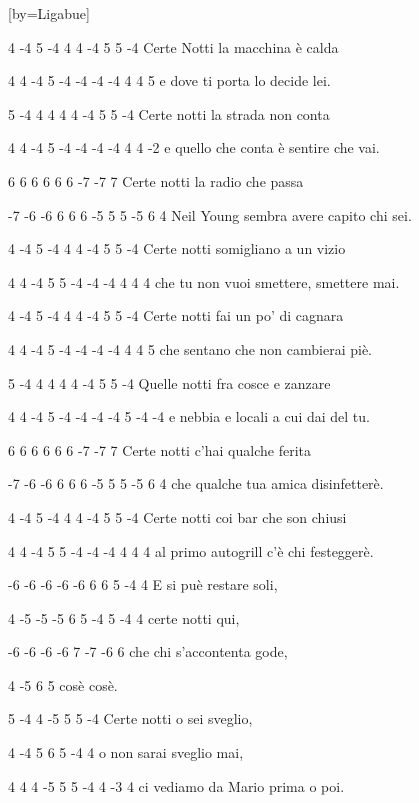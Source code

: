 
[by={Ligabue}]

\beginverse

4 -4  5 -4  4  4  -4  5  5  -4
Certe Notti la macchina è calda 

4 4 -4 5  -4 -4 -4 -4 4 4  5
e dove ti porta lo decide lei.

5 -4  4  4  4  4  -4  5  5  -4
Certe notti la strada non conta 

4  4 -4   5  -4 -4 -4 -4  4   4  -2
e quello che conta è sentire che vai.

6   6 6   6  6 6 -7   -7  7
Certe notti la radio che passa 

-7 -6 -6  6  6  6 -5  5  5 -5   6  4
Neil Young sembra avere capito chi sei.

4 -4  5 -4  4  4  -4  5  5  -4
Certe notti somigliano a un vizio 

 4   4  -4  5 5 -4 -4 -4   4  4  4
che tu non vuoi smettere, smettere mai.

4 -4  5 -4  4  4  -4  5  5  -4
Certe notti fai un po' di cagnara 

4 4 -4 5  -4 -4 -4 -4 4 4  5
che sentano che non cambierai piè.

5 -4  4  4  4  4  -4  5  5  -4
Quelle notti fra cosce e zanzare 

4  4 -4   5  -4 -4 -4 -4  5  -4  -4
e nebbia e locali a cui dai del tu.

6   6 6   6  6 6 -7   -7  7
Certe notti c'hai qualche ferita 

-7 -6 -6  6  6  6 -5  5  5 -5   6  4
che qualche tua amica disinfetterè.

4 -4  5 -4  4  4  -4  5  5  -4
Certe notti coi bar che son chiusi

 4   4  -4  5 5 -4 -4 -4   4  4  4
al primo autogrill c'è chi festeggerè.

-6 -6 -6 -6 -6 6  6 5  -4 4
E si puè restare soli, 

4  -5 -5 -5  6  5 -4 5 -4 4
certe notti qui, 

-6   -6 -6  -6  7 -7 -6 6
che chi s'accontenta gode,

4 -5 6  5
cosè cosè.

5  -4  4 -5    5   5 -4
Certe notti o sei sveglio, 

4 -4   5 6   5 -4  4
o non sarai sveglio mai, 

4  4  4 -5  5  5 -4  4  -3 4
ci vediamo da Mario prima o poi.

